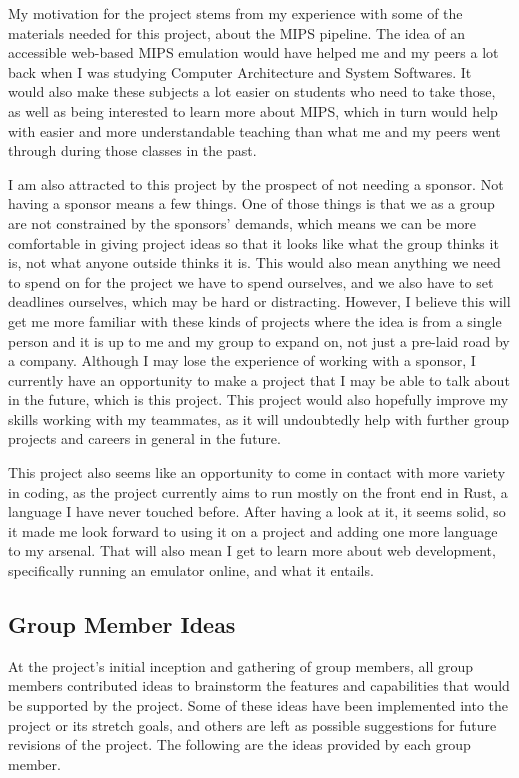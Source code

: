 \documentclass[
    paper=letter,
    parskip=half,
    fontsize=12pt,
    titlepage=firstiscover,
    toc=bibliography,
    numbers=endperiod
]{scrartcl}
\begin{document}
My motivation for the project stems from my experience with some of the
materials needed for this project, about the MIPS pipeline. The idea of
an accessible web-based MIPS emulation would have helped me and my peers
a lot back when I was studying Computer Architecture and System
Softwares. It would also make these subjects a lot easier on students
who need to take those, as well as being interested to learn more about
MIPS, which in turn would help with easier and more understandable
teaching than what me and my peers went through during those classes in
the past.

I am also attracted to this project by the prospect of not needing a
sponsor. Not having a sponsor means a few things. One of those things is
that we as a group are not constrained by the sponsors' demands, which
means we can be more comfortable in giving project ideas so that it
looks like what the group thinks it is, not what anyone outside thinks
it is. This would also mean anything we need to spend on for the project
we have to spend ourselves, and we also have to set deadlines ourselves,
which may be hard or distracting. However, I believe this will get me
more familiar with these kinds of projects where the idea is from a
single person and it is up to me and my group to expand on, not just a
pre-laid road by a company. Although I may lose the experience of
working with a sponsor, I currently have an opportunity to make a
project that I may be able to talk about in the future, which is this
project. This project would also hopefully improve my skills working
with my teammates, as it will undoubtedly help with further group
projects and careers in general in the future.

This project also seems like an opportunity to come in contact with more
variety in coding, as the project currently aims to run mostly on the
front end in Rust, a language I have never touched before. After having
a look at it, it seems solid, so it made me look forward to using it on
a project and adding one more language to my arsenal. That will also
mean I get to learn more about web development, specifically running an
emulator online, and what it entails.

\subsection{Group Member Ideas}
At the project's initial inception and gathering of group members, all
group members contributed ideas to brainstorm the features and
capabilities that would be supported by the project. Some of these ideas
have been implemented into the project or its stretch goals, and others
are left as possible suggestions for future revisions of the project.
The following are the ideas provided by each group member.
\end{document}
